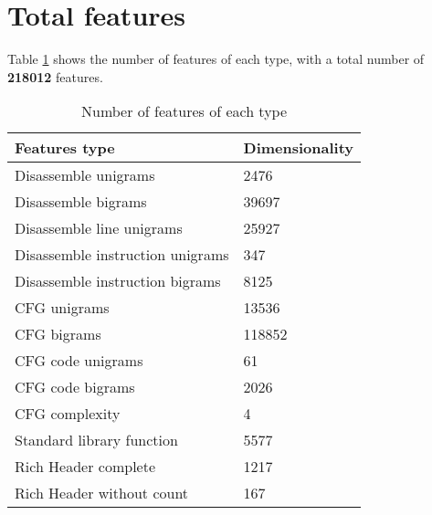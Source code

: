 \section{Total features}
Table \ref{tab:num_feat} shows the number of features of each type, with a total number of \textbf{218012} features.

\begin{table}[!htb]
		\centering
		\caption{Number of features of each type}
		\label{tab:num_feat}
			\begin{tabular}{ll}
				\toprule
				Features type                    & Dimensionality \\
				\midrule
				Disassemble unigrams             & 2476           \\ 
				Disassemble bigrams              & 39697          \\ 
				Disassemble line unigrams        & 25927          \\ 
				Disassemble instruction unigrams & 347            \\ 
				Disassemble instruction bigrams  & 8125           \\ 
				CFG unigrams                     & 13536          \\ 
				CFG bigrams                      & 118852         \\ 
				CFG code unigrams                & 61             \\ 
				CFG code bigrams                 & 2026           \\ 
				CFG complexity                   & 4              \\ 
				Standard library function        & 5577           \\ 
				Rich Header complete             & 1217           \\ 
				Rich Header without count        & 167            \\ 
				\bottomrule
			\end{tabular}
		
\end{table}

